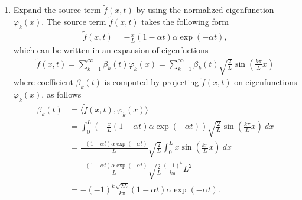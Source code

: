 \documentclass[12pt]{article}
\begin{document}
\begin{enumerate}
	\item Expand the source term $\tilde{f}(x,t)$ by using the normalized eigenfunction $\varphi_{k}(x)$.
	      The source term $\tilde{f}(x,t)$ takes the following form
	      \begin{align}
		      \tilde{f}(x,t) = -\frac{x}{L} (1-\alpha t)\alpha \exp(-\alpha t),
	      \end{align}
	      which can be written in an expansion of eigenfuctions
	      \begin{align}
		      \label{eq:ftilde}
		      \boxed{
			      \tilde{f}(x,t)
			      = \sum_{k=1}^\infty \beta_k(t) \varphi_{k}(x)
			      = \sum_{k=1}^\infty \beta_k(t) \sqrt{\frac{2}{L}} \sin\left( \frac{k \pi}{L} x \right)
		      }
	      \end{align}
	      where coefficient $\beta_{k}(t)$ is computed by projecting $\tilde{f}(x,t)$ on eigenfunctions $\varphi_{k}(x)$, 
	      as follows
	      \begin{align*}
		      \beta_k(t)
		       & = \langle \tilde{f}(x,t),\varphi_{k}(x) \rangle                      \\
		       & = \int_0^L 
		      \left(-\frac{x}{L} (1-\alpha t)\alpha \exp(-\alpha t) \right)
		      \sqrt{\frac{2}{L}} \sin\left(\frac{k \pi}{L} x\right) \ dx              \\
		       & = \frac{-(1-\alpha t) \alpha \exp(-\alpha t)}{L} \sqrt{\frac{2}{L}}
		      \int_0^L x
		      \sin\left(\frac{k \pi}{L} x\right) \ dx                                 \\  
		       & = \frac{-(1-\alpha t) \alpha \exp(-\alpha t)}{L} \sqrt{\frac{2}{L}}
		      \frac{(-1)^k}{k\pi}L^2                                                  \\
		       & = -(-1)^k \frac{\sqrt{2L}}{k \pi}(1-\alpha t)\alpha \exp(-\alpha t).
	      \end{align*}
	      

\end{enumerate}
\end{document}
